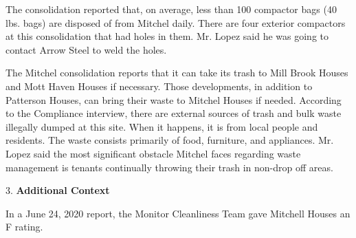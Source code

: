 The consolidation reported that, on average, less than 100 compactor bags (40 lbs. bags) are disposed of from Mitchel daily. There are four exterior compactors at this consolidation that had holes in them. Mr. Lopez said he was going to contact Arrow Steel to weld the holes.  

The Mitchel consolidation reports that it can take its trash to Mill Brook Houses and Mott Haven Houses if necessary. Those developments, in addition to Patterson Houses, can bring their waste to Mitchel Houses if needed. According to the Compliance interview, there are external sources of trash and bulk waste illegally dumped at this site. When it happens, it is from local people and residents. The waste consists primarily of food, furniture, and appliances. Mr. Lopez said the most significant obstacle Mitchel faces regarding waste management is tenants continually throwing their trash in non-drop off areas.

3. \textbf{Additional Context}

In a June 24, 2020 report, the Monitor Cleanliness Team gave Mitchell Houses an F rating. 